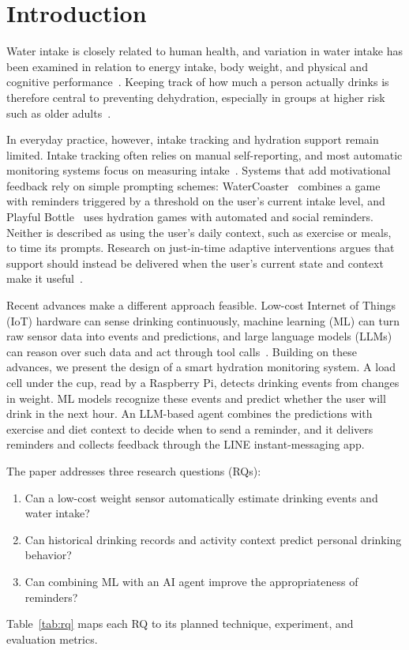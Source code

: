 \documentclass[conference]{IEEEtran}
\begin{document}
\section{Introduction}
\label{sec:intro}

Water intake is closely related to human health, and variation in water intake has been examined in relation to energy intake, body weight, and physical and cognitive performance~\cite{popkin2010water}. Keeping track of how much a person actually drinks is therefore central to preventing dehydration, especially in groups at higher risk such as older adults~\cite{cohen2021fluid}.

In everyday practice, however, intake tracking and hydration support remain limited. Intake tracking often relies on manual self-reporting, and most automatic monitoring systems focus on measuring intake~\cite{cohen2021fluid}. Systems that add motivational feedback rely on simple prompting schemes: WaterCoaster~\cite{lessel2016watercoaster} combines a game with reminders triggered by a threshold on the user's current intake level, and Playful Bottle~\cite{chiu2009playful} uses hydration games with automated and social reminders. Neither is described as using the user's daily context, such as exercise or meals, to time its prompts. Research on just-in-time adaptive interventions argues that support should instead be delivered when the user's current state and context make it useful~\cite{nahumshani2018jitai}.

Recent advances make a different approach feasible. Low-cost Internet of Things (IoT) hardware can sense drinking continuously, machine learning (ML) can turn raw sensor data into events and predictions, and large language models (LLMs) can reason over such data and act through tool calls~\cite{yao2023react,kim2024healthllm}. Building on these advances, we present the design of a smart hydration monitoring system. A load cell under the cup, read by a Raspberry Pi, detects drinking events from changes in weight. ML models recognize these events and predict whether the user will drink in the next hour. An LLM-based agent combines the predictions with exercise and diet context to decide when to send a reminder, and it delivers reminders and collects feedback through the LINE instant-messaging app.

The paper addresses three research questions (RQs):
\begin{enumerate}
\item[\textbf{RQ1}] Can a low-cost weight sensor automatically estimate drinking events and water intake?
\item[\textbf{RQ2}] Can historical drinking records and activity context predict personal drinking behavior?
\item[\textbf{RQ3}] Can combining ML with an AI agent improve the appropriateness of reminders?
\end{enumerate}
Table~\ref{tab:rq} maps each RQ to its planned technique, experiment, and evaluation metrics.
\end{document}
